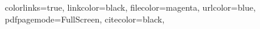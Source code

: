 \hypersetup
{
    colorlinks=true,
    linkcolor=black,
    filecolor=magenta,      
    urlcolor=blue,
    pdfpagemode=FullScreen,
    citecolor=black,
}